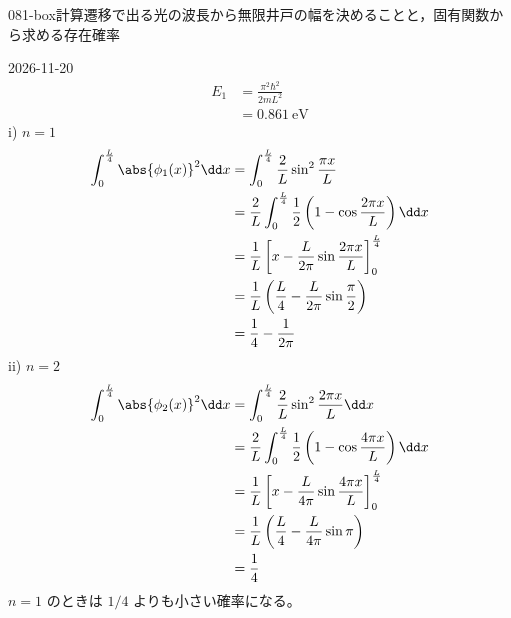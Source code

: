 \documentclass[uplatex,dvipdfmx,a4paper,11pt]{jsarticle}
\begin{document}
\begin{mondai}{081-box}{計算}{遷移で出る光の波長から無限井戸の幅を決めることと，固有関数から求める存在確率}
\begin{kotaeutsushi}{2026-11-20}
\begin{align*}
E_{1}&=\frac{\pi^{2}\hbar^{2}}{2mL^{2}}\\
&=\qty{0.861}{\electronvolt}
\end{align*}
i) $n=1$
\begin{align*}
\int_{0}^{\frac{L}{4}}\abs{\phi_{1}(x)}^{2}\dd x&=\int_{0}^{\frac{L}{4}}\frac{2}{L}\sin^{2}\frac{\pi x}{L}\\
&=\frac{2}{L}\int_{0}^{\frac{L}{4}}\frac{1}{2}\left(1-\cos\frac{2\pi x}{L}\right)\dd x\\
&=\frac{1}{L}\left[x-\frac{L}{2\pi}\sin\frac{2\pi x}{L}\right]_{0}^{\frac{L}{4}}\\
&=\frac{1}{L}\left(\frac{L}{4}-\frac{L}{2\pi}\sin\frac{\pi}{2}\right)\\
&=\frac{1}{4}-\frac{1}{2\pi}
\end{align*}
ii) $n=2$
\begin{align*}
\int_{0}^{\frac{L}{4}}\abs{\phi_{2}(x)}^{2}\dd x&=\int_{0}^{\frac{L}{4}}\frac{2}{L}\sin^{2}\frac{2\pi x}{L}\dd x\\
&=\frac{2}{L}\int_{0}^{\frac{L}{4}}\frac{1}{2}\left(1-\cos\frac{4\pi x}{L}\right)\dd x\\
&=\frac{1}{L}\left[x-\frac{L}{4\pi}\sin\frac{4\pi x}{L}\right]_{0}^{\frac{L}{4}}\\
&=\frac{1}{L}\left(\frac{L}{4}-\frac{L}{4\pi}\sin\pi\right)\\
&=\frac{1}{4}
\end{align*}
$n=1$ のときは $1/4$ よりも小さい確率になる。


\end{kotaeutsushi}
\end{mondai}
\end{document}
